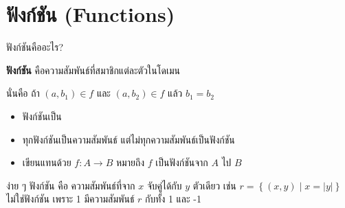 \documentclass[11pt, aspectratio=169]{beamer}
\begin{document}
\section{ฟังก์ชัน (Functions)}

\begin{frame}{ฟังก์ชันคืออะไร?}
  \begin{explanation}
    \textbf{ฟังก์ชัน} คือความสัมพันธ์ที่สมาชิกแต่ละตัวในโดเมน

    \medskip
    นั่นคือ ถ้า $(a, b_1) \in f$ และ $(a, b_2) \in f$ แล้ว $b_1 = b_2$
  \end{explanation}

  \begin{itemize}
    \item ฟังก์ชันเป็น 
    \item ทุกฟังก์ชันเป็นความสัมพันธ์ แต่ไม่ทุกความสัมพันธ์เป็นฟังก์ชัน
    \item เขียนแทนด้วย $f: A \to B$ หมายถึง $f$ เป็นฟังก์ชันจาก $A$ ไป $B$
  \end{itemize}

  \begin{intuition}[สังเกต]
    ง่าย ๆ ฟังก์ชัน คือ ความสัมพันธ์ที่จาก $x$ จับคู่ได้กับ $y$ ตัวเดียว เช่น $r = \left\{(x,y) \mid x = \left\lvert y\right\rvert \right\} $ ไม่ใช่ฟังก์ชัน เพราะ 1 มีความสัมพันธ์ $r$ กับทั้ง 1 และ -1
  \end{intuition}
\end{frame}
\end{document}
